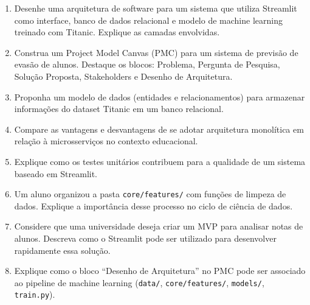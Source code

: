 \documentclass[12pt,a4paper]{article}
\begin{document}
\begin{enumerate}[resume]

\item Desenhe uma arquitetura de software para um sistema que utiliza Streamlit como interface, banco de dados relacional e modelo de machine learning treinado com Titanic. Explique as camadas envolvidas.

\item Construa um Project Model Canvas (PMC) para um sistema de previsão de evasão de alunos. Destaque os blocos: Problema, Pergunta de Pesquisa, Solução Proposta, Stakeholders e Desenho de Arquitetura.

\item Proponha um modelo de dados (entidades e relacionamentos) para armazenar informações do dataset Titanic em um banco relacional.

\item Compare as vantagens e desvantagens de se adotar arquitetura monolítica em relação à microsserviços no contexto educacional.

\item Explique como os testes unitários contribuem para a qualidade de um sistema baseado em Streamlit.

\item Um aluno organizou a pasta \texttt{core/features/} com funções de limpeza de dados. Explique a importância desse processo no ciclo de ciência de dados.

\item Considere que uma universidade deseja criar um MVP para analisar notas de alunos. Descreva como o Streamlit pode ser utilizado para desenvolver rapidamente essa solução.

\item Explique como o bloco “Desenho de Arquitetura” no PMC pode ser associado ao pipeline de machine learning (\texttt{data/}, \texttt{core/features/}, \texttt{models/}, \texttt{train.py}).


\end{enumerate}


\clearpage
\end{document}
